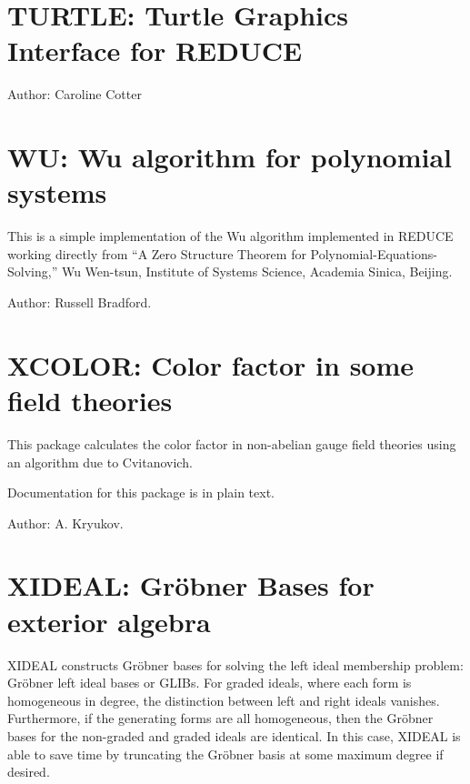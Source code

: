 
\newpage

\section{TURTLE: Turtle Graphics Interface for REDUCE}

Author: Caroline Cotter



\newpage

\section{WU: Wu algorithm for polynomial systems} 

This is a simple implementation of the Wu algorithm implemented in REDUCE
working directly from ``A Zero Structure Theorem for
Polynomial-Equations-Solving,'' Wu Wen-tsun, Institute of Systems Science,
Academia Sinica, Beijing.

Author: Russell Bradford.


\newpage

\section{XCOLOR: Color factor in some field theories}


This package calculates the color factor in non-abelian gauge field
theories using an algorithm due to Cvitanovich.

Documentation for this package is in plain text.

Author: A. Kryukov.


\newpage

\section{XIDEAL: Gr\"obner Bases for exterior algebra} 

XIDEAL constructs Gr\"obner bases for solving the left ideal membership
problem: Gr\"obner left ideal bases or GLIBs. For graded ideals, where each
form is homogeneous in degree, the distinction between left and right
ideals vanishes. Furthermore, if the generating forms are all homogeneous,
then the Gr\"obner bases for the non-graded and graded ideals are
identical. In this case, XIDEAL is able to save time by truncating the
Gr\"obner basis at some maximum degree if desired.

